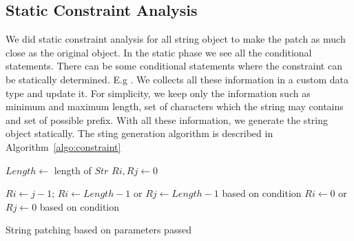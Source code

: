 \subsection{Static Constraint Analysis}
\label{subsec:staticConstraint}

We did static constraint analysis for all string object to make the patch as much
close as the original object. In the static phase we see all the conditional 
statements. There can be some conditional statements where the constraint can 
be statically determined. E.g . We collects all these
information in a custom data type and update it. For simplicity, we keep only the 
information such as minimum and maximum length, set of characters which the string
may contains and set of possible prefix. With all these information, we generate 
the string object statically. The sting generation algorithm is described in
Algorithm~\ref{algo:constraint} 

\begin{algorithm}
\small
\DontPrintSemicolon
{}
\Begin
{
	$Length \longleftarrow$ length of $Str$\;
	{
		$Ri, Rj \longleftarrow 0$\;
	}
	\Else
	{
		{
			$Ri \longleftarrow j - 1$;
		}
		{
			$Ri \longleftarrow Length - 1$ or $Rj \longleftarrow Length - 1$ based on
			condition\; 
		}
		{
			$Ri \longleftarrow 0$ or $Rj \longleftarrow 0$ based on
			condition\; 
		}
		
		
	}	

}
\caption{String patching based on parameters passed}
\label{algo:stringPatchParametr}
\end{algorithm}